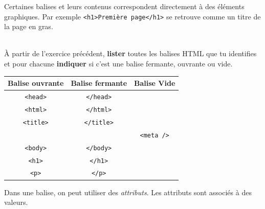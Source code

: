 \documentclass[a4paper,12pt]{article}
\newenvironment{eleve}%
{\begin{activite}\color{noiramu}\\}
{\end{activite}}
\begin{document}
Certaines balises et leurs contenus correspondent directement à des
éléments graphiques. Par exemple
\texttt{\textless{}h1\textgreater{}Première\ page\textless{}/h1\textgreater{}}
se retrouve comme un titre de la page en gras.
\begin{eleve}
    À partir de l'exercice précédent, \textbf{lister} toutes les balises
HTML que tu identifies et pour chacune \textbf{indiquer} si c'est une
balise fermante, ouvrante ou vide.
        
        \end{eleve}\begin{methode}
    \begin{longtable}[]{@{}ccc@{}}
\toprule
Balise ouvrante & Balise fermante & Balise Vide\tabularnewline
\midrule
\endhead
\texttt{\textless{}head\textgreater{}} &
\texttt{\textless{}/head\textgreater{}} &\tabularnewline
\texttt{\textless{}html\textgreater{}} &
\texttt{\textless{}/html\textgreater{}} &\tabularnewline
\texttt{\textless{}title\textgreater{}} &
\texttt{\textless{}/title\textgreater{}} &\tabularnewline
& & \texttt{\textless{}meta\ /\textgreater{}}\tabularnewline
\texttt{\textless{}body\textgreater{}} &
\texttt{\textless{}/body\textgreater{}} &\tabularnewline
\texttt{\textless{}h1\textgreater{}} &
\texttt{\textless{}/h1\textgreater{}} &\tabularnewline
\texttt{\textless{}p\textgreater{}} &
\texttt{\textless{}/p\textgreater{}} &\tabularnewline
\bottomrule
\end{longtable}

        \end{methode}
    Dans une balise, on peut utiliser des \emph{attributs}. Les attributs
sont associés à des valeurs.
\end{document}
